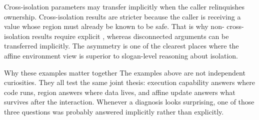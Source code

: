 
Cross-isolation parameters may transfer implicitly when the caller relinquishes ownership. Cross-isolation results are stricter because the caller is receiving a value whose region must already be known to be safe. That is why non- cross-isolation results require explicit , whereas disconnected arguments can be transferred implicitly. The asymmetry is one of the clearest places where the affine environment view is superior to slogan-level reasoning about isolation.

\begin{propositionbox}{Why these examples matter together}
The examples above are not independent curiosities. They all test the same joint thesis: execution capability answers where code runs, region answers where data lives, and affine update answers what survives after the interaction. Whenever a diagnosis looks surprising, one of those three questions was probably answered implicitly rather than explicitly.
\end{propositionbox}
